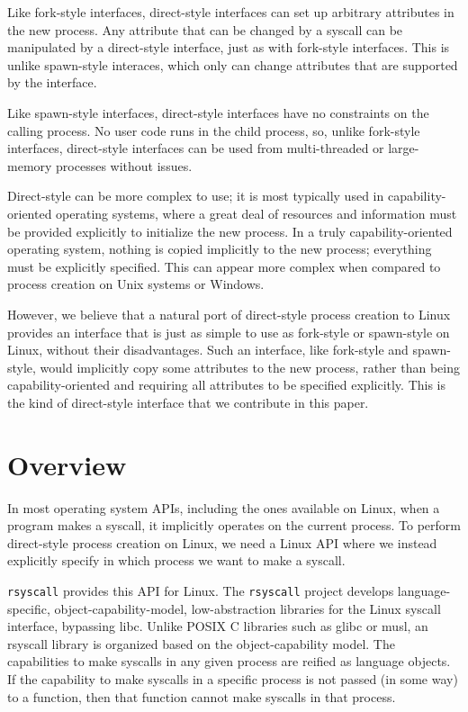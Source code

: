 \documentclass{acmart}
\begin{document}
Like fork-style interfaces,
direct-style interfaces can set up arbitrary attributes in the new process.
Any attribute that can be changed by a syscall
can be manipulated by a direct-style interface,
just as with fork-style interfaces.
This is unlike spawn-style interaces,
which only can change attributes that are supported by the interface.

Like spawn-style interfaces,
direct-style interfaces have no constraints on the calling process.
No user code runs in the child process,
so, unlike fork-style interfaces,
direct-style interfaces can be used from multi-threaded or large-memory processes without issues.

Direct-style can be more complex to use;
it is most typically used in capability-oriented operating systems,
where a great deal of resources and information must be provided explicitly to initialize the new process.
In a truly capability-oriented operating system,
nothing is copied implicitly to the new process;
everything must be explicitly specified.
This can appear more complex
when compared to process creation on Unix systems or Windows.

However, we believe that a natural port of direct-style process creation to Linux
provides an interface that is just as simple to use as fork-style or spawn-style on Linux,
without their disadvantages.
Such an interface, like fork-style and spawn-style,
would implicitly copy some attributes to the new process,
rather than being capability-oriented and requiring all attributes to be specified explicitly.
This is the kind of direct-style interface that we contribute in this paper.

\section{Overview}\label{examples}
In most operating system APIs, including the ones available on Linux,
when a program makes a syscall, it implicitly operates on the current process.
To perform direct-style process creation on Linux,
we need a Linux API where we instead explicitly specify in which process we want to make a syscall.

\texttt{rsyscall} provides this API for Linux.
The \texttt{rsyscall} project develops
language-specific, object-capability-model, low-abstraction libraries for the Linux syscall interface,
bypassing libc.
Unlike POSIX C libraries such as glibc or musl,
an rsyscall library is organized based on the object-capability model.
The capabilities to make syscalls in any given process are reified as language objects.
If the capability to make syscalls in a specific process is not passed (in some way) to a function,
then that function cannot make syscalls in that process.
\end{document}
